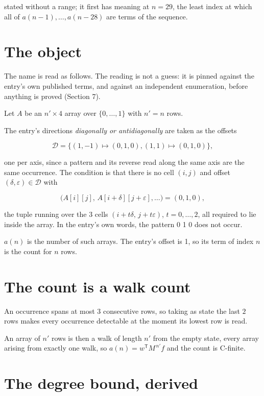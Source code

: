 \documentclass[11pt]{article}
\theoremstyle{definition}
\begin{document}
stated without a range; it first has meaning at $n = 29$, the least index at which all of $a(n-1),\dots,a(n-28)$ are terms of the sequence.

\section{The object}

The name is read as follows. The reading is not a guess: it is pinned against the entry's own published terms, and against an independent enumeration, before anything is proved (Section 7).

Let $A$ be an $n' \times 4$ array over $\{0,\dots,1\}$ with $n' = n$ rows.

The entry's directions {\itshape diagonally or antidiagonally} are taken as the offsets

\[\mathcal{D} = \{(1,-1)\mapsto(0,1,0), (1,1)\mapsto(0,1,0)\},\]

one per axis, since a pattern and its reverse read along the same axis are the same occurrence. The condition is that there is no cell $(i,j)$ and offset $(\delta,\varepsilon)\in\mathcal{D}$ with

\[\bigl(A[i][j],\,A[i{+}\delta][j{+}\varepsilon],\dots\bigr) = (0, 1, 0),\]

the tuple running over the $3$ cells $(i+t\delta,\,j+t\varepsilon)$, $t = 0,\dots,2$, all required to lie inside the array. In the entry's own words, the pattern 0 1 0 does not occur.

$a(n)$ is the number of such arrays. The entry's offset is 1, so its term of index $n$ is the count for $n$ rows.

\section{The count is a walk count}

An occurrence spans at most $3$ consecutive rows, so taking as state the last $2$ rows makes every occurrence detectable at the moment its lowest row is read.

An array of $n'$ rows is then a walk of length $n'$ from the empty state, every array arising from exactly one walk, so $a(n) = w^{\mathsf T}M^{\,n'}f$ and the count is C-finite.

\section{The degree bound, derived}
\end{document}
